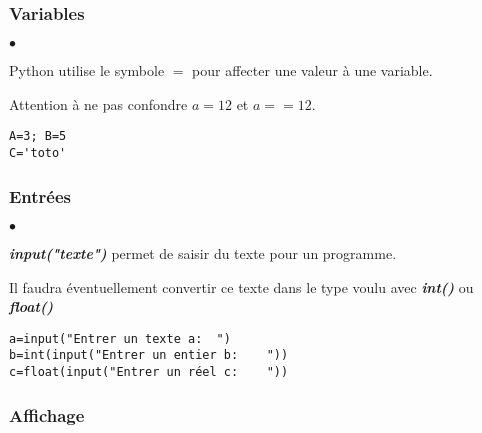 \documentclass[10pt,dvipsnames,  dvips]{article}
\begin{document}
\vspace{0.5cm}
\subsubsection*{Variables}

\begin{minipage}[t]{12cm}
\begin{list}{$\bullet$}{}
\item Python utilise le symbole $\boldsymbol{=}$ pour affecter une valeur à une variable.
\item Attention à ne pas confondre $a=12$ et $a==12$.
\end{list}
\end{minipage}
\hspace{0.5cm}
\begin{minipage}[t]{5cm}
\lstset{ title='Python3', style=PYTHON}
\vspace{-1cm}
\begin{lstlisting}
A=3; B=5
C='toto'
\end{lstlisting}
\end{minipage}

\subsubsection*{Entrées}


\begin{minipage}[t]{9cm}
\begin{list}{$\bullet$}{}
\item \textbf{\textit{input("texte")}} permet de saisir du texte pour un programme.
\item Il faudra éventuellement convertir ce texte dans le type voulu avec \textbf{\textit{int()}} ou \textbf{\textit{float()}}
\end{list}
\end{minipage}
\hspace{0.5cm}
\begin{minipage}[t]{8cm}
\lstset{ style=PYTHON}
\begin{lstlisting}
a=input("Entrer un texte a:  ")
b=int(input("Entrer un entier b:    "))
c=float(input("Entrer un réel c:    "))
\end{lstlisting}
\end{minipage}


\subsubsection*{Affichage}
\end{document}
